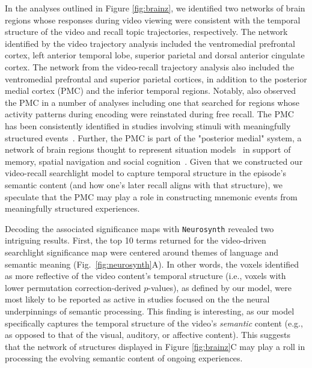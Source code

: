 \documentclass{article}
\begin{document}
In the analyses outlined in Figure \ref{fig:brainz}, we identified two networks of brain regions whose responses during video viewing were consistent with the temporal structure of the video and recall topic trajectories, respectively. The network identified by the video trajectory analysis included the ventromedial prefrontal cortex, left anterior temporal lobe, superior parietal and dorsal anterior cingulate cortex. The network from the video-recall trajectory analysis also included the ventromedial prefrontal and superior parietal cortices, in addition to the posterior medial cortex (PMC) and the inferior temporal regions. Notably, \cite{ChenEtal17} also observed the PMC in a number of analyses including one that searched for regions whose activity patterns during encoding were reinstated during free recall. The PMC has been consistently identified in studies involving stimuli with meaningfully structured events~\citep{CohnRang17}. Further, the PMC is part of the "posterior medial" system, a network of brain regions thought to represent situation models~\citep{ZackEtal07} in support of memory, spatial navigation and social cognition~\citep{RangRitc12}. Given that we constructed our video-recall searchlight model to capture temporal structure in the episode's semantic content (and how one's later recall aligns with that structure), we speculate that the PMC may play a role in constructing mnemonic events from meaningfully structured experiences.

Decoding the associated significance maps with \texttt{Neurosynth} revealed two intriguing results.  First, the top 10 terms returned for the video-driven searchlight significance map were centered around themes of language and semantic meaning (Fig.~\ref{fig:neurosynth}A).  In other words, the voxels identified as more reflective of the video content's temporal structure (i.e., voxels with lower permutation correction-derived $p$-values), as defined by our model, were most likely to be reported as active in studies focused on the the neural underpinnings of semantic processing.  This finding is interesting, as our model specifically captures the temporal structure of the video's \textit{semantic} content (e.g., as opposed to that of the visual, auditory, or affective content).  This suggests that the network of structures displayed in Figure \ref{fig:brainz}C may play a roll in processing the evolving semantic content of ongoing experiences.
\end{document}
